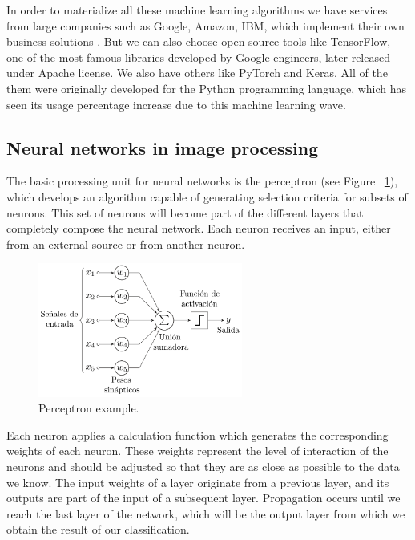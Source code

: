 In order to materialize all these machine learning algorithms we have services from large companies such as Google, Amazon, IBM, which
implement their own business solutions \cite{cloud_computing}.
But we can also choose open source tools like TensorFlow, one of the most famous  libraries developed by Google engineers, later released under Apache license.
We also have others like PyTorch and Keras.
All of the them were originally developed for the Python programming language, which has seen its usage percentage increase due to this machine learning \cite{python_machine} wave.


\subsection{Neural networks in image processing}\label{subsec: neural-networks-in-image-treatment}
The basic processing unit for neural networks is the perceptron (see Figure ~\ref{fig:Perceptrón}),
which develops an algorithm capable of generating selection criteria for subsets of neurons.
This set of neurons will become part of the different layers that completely compose the neural network.
Each neuron receives an input, either from an external source or from another neuron.



\begin{figure}[H]
    \centering
    \includegraphics[width=0.6\textwidth]{images/chapter1/perceptron.png}
    \caption{Perceptron example.}
    \label{fig:Perceptrón}
\end{figure}

Each neuron applies a calculation function which generates the corresponding weights of each neuron. These weights represent the level of interaction of the neurons and should be adjusted so that they are as close as possible to the data we know.
The input weights of a layer originate from a previous layer, and its outputs are part of the input of a subsequent layer. Propagation occurs until we reach the last layer of the network, which will be the output layer from which we obtain the result of our classification.

